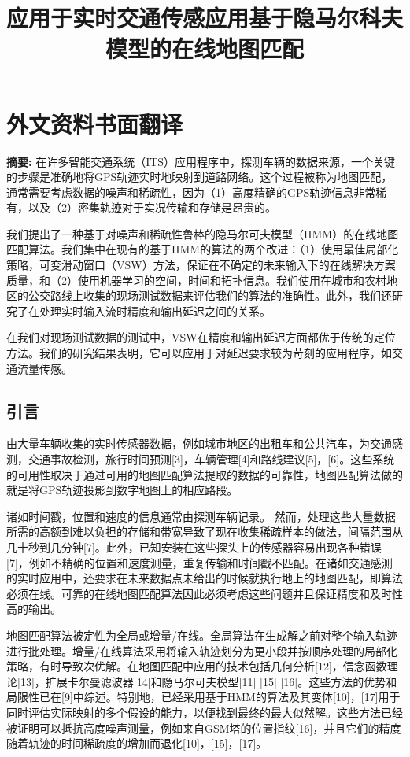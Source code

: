 \chapter{外文资料书面翻译}

\title{应用于实时交通传感应用基于隐马尔科夫模型的在线地图匹配}


\textbf{摘要:} 在许多智能交通系统（ITS）应用程序中，探测车辆的数据来源，一个关键的步骤是准确地将GPS轨迹实时地映射到道路网络。这个过程被称为地图匹配，通常需要考虑数据的噪声和稀疏性，因为（1）高度精确的GPS轨迹信息非常稀有，以及（2）密集轨迹对于实况传输和存储是昂贵的。

我们提出了一种基于对噪声和稀疏性鲁棒的隐马尔可夫模型（HMM）的在线地图匹配算法。我们集中在现有的基于HMM的算法的两个改进：（1）使用最佳局部化策略，可变滑动窗口（VSW）方法，保证在不确定的未来输入下的在线解决方案质量，和（2）使用机器学习的空间，时间和拓扑信息。我们使用在城市和农村地区的公交路线上收集的现场测试数据来评估我们的算法的准确性。此外，我们还研究了在处理实时输入流时精度和输出延迟之间的关系。

在我们对现场测试数据的测试中，VSW在精度和输出延迟方面都优于传统的定位方法。我们的研究结果表明，它可以应用于对延迟要求较为苛刻的应用程序，如交通流量传感。

\section{引言}
由大量车辆收集的实时传感器数据，例如城市地区的出租车和公共汽车，为交通感测，交通事故检测，旅行时间预测[3]，车辆管理[4]和路线建议[5]，[6]。这些系统的可用性取决于通过可用的地图匹配算法提取的数据的可靠性，地图匹配算法做的就是将GPS轨迹投影到数字地图上的相应路段。

诸如时间戳，位置和速度的信息通常由探测车辆记录。 然而，处理这些大量数据所需的高额到难以负担的存储和带宽导致了现在收集稀疏样本的做法，间隔范围从几十秒到几分钟[7]。此外，已知安装在这些探头上的传感器容易出现各种错误[7]，例如不精确的位置和速度测量，重复传输和时间戳不匹配。在诸如交通感测的实时应用中，还要求在未来数据点未给出的时候就执行地上的地图匹配，即算法必须在线。可靠的在线地图匹配算法因此必须考虑这些问题并且保证精度和及时性高的输出。

地图匹配算法被定性为全局或增量/在线。全局算法在生成解之前对整个输入轨迹进行批处理。增量/在线算法采用将输入轨迹划分为更小段并按顺序处理的局部化策略，有时导致次优解。在地图匹配中应用的技术包括几何分析[12]，信念函数理论[13]，扩展卡尔曼滤波器[14]和隐马尔可夫模型[11] [15] [16]。这些方法的优势和局限性已在[9]中综述。特别地，已经采用基于HMM的算法及其变体[10]，[17]用于同时评估实际映射的多个假设的能力，以便找到最终的最大似然解。这些方法已经被证明可以抵抗高度噪声测量，例如来自GSM塔的位置指纹[16]，并且它们的精度随着轨迹的时间稀疏度的增加而退化[10]，[15]，[17]。

